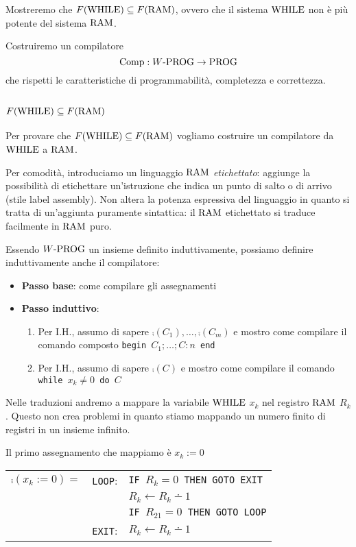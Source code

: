Mostreremo che $F(\text{WHILE}) \subseteq F(\text{RAM})$, ovvero che il sistema $\text{WHILE}$ non è più potente del sistema $\text{RAM}$.

Costruiremo un compilatore
$$ \text{Comp}: W\text{-PROG} \rightarrow \text{PROG} $$
che rispetti le caratteristiche di programmabilità, completezza e correttezza.

\subsection{$F(\text{WHILE}) \subseteq F(\text{RAM})$}

Per provare che $F(\text{WHILE}) \subseteq F(\text{RAM})$ vogliamo costruire un compilatore da $\text{WHILE}$ a $\text{RAM}$.

Per comodità, introduciamo un linguaggio $\text{RAM}$ \textit{etichettato}: aggiunge la possibilità di etichettare un'istruzione che indica un punto di salto o di arrivo (stile label assembly). Non altera la potenza espressiva del linguaggio in quanto si tratta di un'aggiunta puramente sintattica: il $\text{RAM}$ etichettato si traduce facilmente in $\text{RAM}$ puro.

Essendo $W\text{-PROG}$ un insieme definito induttivamente, possiamo definire induttivamente anche il compilatore:
\begin{itemize}
	\item \textbf{Passo base}: come compilare gli assegnamenti
	
    \item \textbf{Passo induttivo}:
	\begin{enumerate}
		\item Per I.H., assumo di sapere $\comp(C_1), \dots, \comp(C_m)$ e mostro come compilare il comando composto \texttt{begin $C_1; \dots; C:n$ end}
	
    	\item Per I.H., assumo di sapere $\comp(C)$ e mostro come compilare il comando \texttt{while $x_k \neq 0$ do $C$}
	\end{enumerate}
\end{itemize}

Nelle traduzioni andremo a mappare la variabile $\text{WHILE}$ $x_k$ nel registro $\text{RAM}$ $R_k$. Questo non crea problemi in quanto stiamo mappando un numero finito di registri in un insieme infinito.

Il primo assegnamento che mappiamo è $x_k := 0$
\begin{center}
	\renewcommand{\arraystretch}{1.25}
	\begin{tabular}{l|r l|}
		\cline{2-3}
		$\comp(x_k:=0) =$ & \texttt{LOOP}:& \texttt{IF $R_k = 0$ THEN GOTO EXIT}\\
		&& $R_k\leftarrow R_k \dotminus 1$ \\
		&& \texttt{IF $R_{21} = 0$ THEN GOTO LOOP} \\
		&\texttt{EXIT}:& $R_k \leftarrow R_k \dotminus 1$ \\
		\cline{2-3}
	\end{tabular}\vspace{.15cm}
\end{center}

